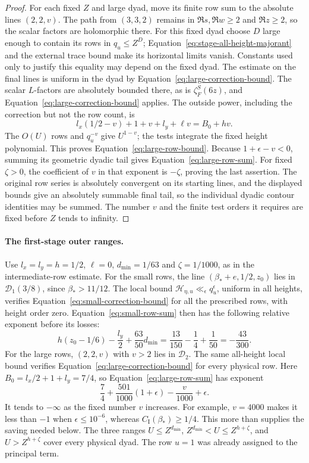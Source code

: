 \documentclass[11pt,a4paper]{article}
\numberwithin{equation}{section}
\numberwithin{figure}{section}
\theoremstyle{definition}
\theoremstyle{remark}
\begin{document}
\begin{proof}
For each fixed $Z$ and large dyad, move its finite row sum to the absolute
lines $(2,2,v)$.  The path from $(3,3,2)$ remains in $\Re s,\Re w\ge2$
and $\Re z\ge2$, so the scalar factors are holomorphic there.  For this
fixed dyad choose $D$ large enough to contain its rows in $q_u\le Z^D$;
Equation~\eqref{eq:stage-all-height-majorant} and the external trace bound
make its horizontal limits vanish.  Constants used only to justify this
equality may depend on the fixed dyad.  The estimate on the final lines
is uniform in the dyad by Equation~\eqref{eq:large-correction-bound}.
The scalar $L$-factors
are absolutely bounded there, as is $\zeta_F^S(6z)$, and
Equation~\eqref{eq:large-correction-bound} applies.  The outside power,
including the correction but not the row count, is
\[
 l_x(1/2-v)+1+v+l_y+\ell v=B_0+hv.
\]
The $O(U)$ rows and $q_u^{-v}$ give $U^{1-v}$; the tests integrate the
fixed height polynomial.  This proves Equation~\eqref{eq:large-row-bound}.
Because $1+\epsilon-v<0$, summing its geometric dyadic tail gives
Equation~\eqref{eq:large-row-sum}.  For fixed $\zeta>0$, the coefficient
of $v$ in that exponent is $-\zeta$, proving the last assertion.
The original row series is absolutely convergent on its starting lines,
and the displayed bounds give an absolutely summable final tail, so the
individual dyadic contour identities may be summed.
The number $v$ and the finite test orders it requires are fixed before
$Z$ tends to infinity.
\end{proof}

\paragraph{The first-stage outer ranges.}

Use $l_x=l_y=h=1/2$, $\ell=0$, $d_{\min}=1/63$ and
$\zeta=1/1000$, as in the intermediate-row estimate.  For the small rows, the line $(\beta_*+e,1/2,z_0)$ lies in
$\mathcal D_1(3/8)$, since $\beta_*>11/12$.  The local bound
$\mathcal H_{\eta,u}\ll_\epsilon q_u^\epsilon$, uniform in all heights,
verifies Equation~\eqref{eq:small-correction-bound} for all the prescribed
rows, with height order zero.  Equation~\eqref{eq:small-row-sum} then has
the following relative exponent before its losses:
\[
 h(z_0-1/6)-\frac{l_y}{2}+\frac{63}{50}d_{\min}
 =\frac{13}{150}-\frac14+\frac1{50}
 =-\frac{43}{300}.
\]
For the large rows, $(2,2,v)$ with $v>2$ lies in $\mathcal D_2$.  The same
all-height local bound verifies Equation~\eqref{eq:large-correction-bound}
for every physical row.  Here $B_0=l_x/2+1+l_y=7/4$, so
Equation~\eqref{eq:large-row-sum} has exponent
\[
 \frac74+\frac{501}{1000}(1+\epsilon)-\frac v{1000}+\epsilon.
\]
It tends to $-\infty$ as the fixed number $v$ increases.  For example,
$v=4000$ makes it less than $-1$ when $\epsilon\le10^{-6}$, whereas
$C_{\mathrm I}(\beta_*)\ge1/4$.  This more than supplies the saving needed
below.  The three ranges $U\le Z^{d_{\min}}$,
$Z^{d_{\min}}<U\le Z^{h+\zeta}$, and $U>Z^{h+\zeta}$ cover every physical
dyad.  The row $u=1$ was already assigned to the principal term.
\end{document}
